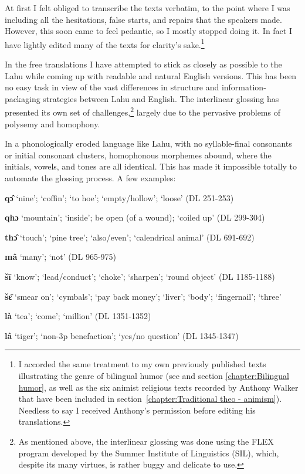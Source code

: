At first I felt obliged to transcribe the texts verbatim, to the point
where I was including all the hesitations, false starts, and repairs
that the speakers made. However, this soon came to feel pedantic, so I
mostly stopped doing it. In fact I have lightly edited many of the
texts for clarity's sake.\footnote{I accorded the same treatment to my
  own previously published texts illustrating the genre of bilingual
  humor (see \citet{matisoff1969lahu} and section
  \ref{chapter:Bilingual humor}, as well as the six animist religious
    texts recorded by Anthony Walker that have been included in
    section~\ref{chapter:Traditional theo - animism}). Needless to
    say I received Anthony's permission before editing his
    translations.}

In the free translations I have attempted to stick as closely as
possible to the Lahu while coming up with readable and natural English
versions. This has been no easy task in view of the vast differences in
structure and information-packaging strategies between Lahu and English.
The interlinear glossing has presented its own set of
challenges,\footnote{As mentioned above, the interlinear glossing was
  done using the FLEX program developed by the Summer Institute of
  Linguistics (SIL), which, despite its many virtues, is rather buggy
  and delicate to use.} largely due to the pervasive problems of
polysemy and homophony.

In a phonologically eroded language like Lahu, with no syllable-final
consonants or initial consonant clusters, homophonous morphemes abound,
where the initials, vowels, and tones are all identical. This has made
it impossible totally to automate the glossing process. A few examples:

\textbf{qɔ̂} `nine'; `coffin'; `to hoe'; `empty/hollow'; `loose' (DL
251-253)

\textbf{qhɔ} `mountain'; `inside'; be open (of a wound); `coiled up'
(DL 299-304)

\textbf{thɔ̂} `touch'; `pine tree'; `also/even'; `calendrical animal' (DL
691-692)

\textbf{mâ} `many'; `not' (DL 965-975)

\textbf{šī} `know'; `lead/conduct'; `choke'; `sharpen'; `round object'
(DL 1185-1188)

\textbf{šɛ̄} `smear on'; `cymbals'; `pay back money'; `liver'; `body';
`fingernail'; `three'

\textbf{là} `tea'; `come'; `million' (DL 1351-1352)

\textbf{lâ} `tiger'; `non-3p benefaction'; `yes/no question' (DL
1345-1347)

